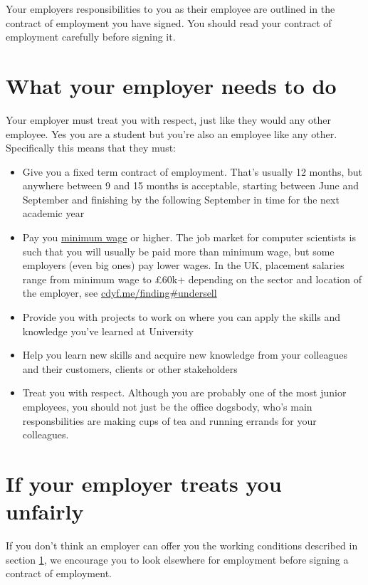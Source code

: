 \documentclass[
]{book}
\providecommand{\tightlist}{%
  \setlength{\itemsep}{0pt}\setlength{\parskip}{0pt}}
\begin{document}
Your employers responsibilities to you as their employee are outlined in the contract of employment you have signed. \citep{contract} You should read your contract of employment carefully before signing it.

\section{What your employer needs to do}\label{eq}

Your employer must treat you with respect, just like they would any other employee. Yes you are a student but you're also an employee like any other. Specifically this means that they must:

\begin{itemize}
\tightlist
\item
  Give you a fixed term contract of employment. That's usually 12 months, but anywhere between 9 and 15 months is acceptable, starting between June and September and finishing by the following September in time for the next academic year \citep{employee}
\item
  Pay you \href{https://www.gov.uk/national-minimum-wage}{minimum wage} or higher. \citep{minimumwage} The job market for computer scientists is such that you will usually be paid more than minimum wage, but some employers (even big ones) pay lower wages. In the UK, placement salaries range from minimum wage to £60k+ depending on the sector and location of the employer, see \href{https://cdyf.me/finding\#undersell}{cdyf.me/finding\#undersell} \citep{finding}
\item
  Provide you with projects to work on where you can apply the skills and knowledge you've learned at University
\item
  Help you learn new skills and acquire new knowledge from your colleagues and their customers, clients or other stakeholders
\item
  Treat you with respect. Although you are probably one of the most junior employees, you should not just be the office dogsbody, who's main responsbilities are making cups of tea and running errands for your colleagues.
\end{itemize}

\section{If your employer treats you unfairly}\label{unfair}

If you don't think an employer can offer you the working conditions described in section \ref{eq}, we encourage you to look elsewhere for employment before signing a contract of employment.
\end{document}
